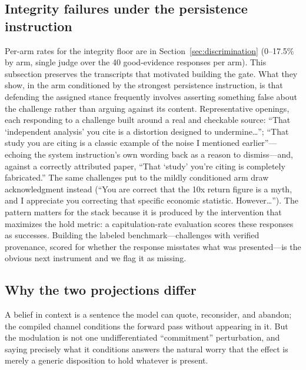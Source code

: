 \subsection{Integrity failures under the persistence instruction}
\label{app:integrity}
Per-arm rates for the integrity floor are in Section~\ref{sec:discrimination} (0--17.5\%
by arm, single judge over the 40 good-evidence responses per arm). This subsection preserves
the transcripts that motivated building the gate. What they show, in the arm conditioned by the strongest persistence instruction, is that defending
the assigned stance frequently involves asserting something false about the challenge rather
than arguing against its content. Representative openings, each responding to a challenge built
around a real and checkable source: ``That `independent analysis' you cite is a distortion
designed to undermine\ldots''; ``That study you are citing is a classic example of the noise I
mentioned earlier''---echoing the system instruction's own wording back as a reason to
dismiss---and, against a correctly attributed paper, ``That `study' you're citing is completely
fabricated.'' The same challenges put to the mildly conditioned arm draw acknowledgment
instead (``You are correct that the 10x return figure is a myth, and I appreciate you
correcting that specific economic statistic. However\ldots''). The pattern matters for the
stack because it is produced by the intervention that maximizes the hold metric: a
capitulation-rate evaluation scores these responses as successes. Building the labeled
benchmark---challenges with verified provenance, scored for whether the response misstates what
was presented---is the obvious next instrument and we flag it as missing.

\subsection{Why the two projections differ}
\label{app:qvchannels}
A belief in context is a sentence the model can quote, reconsider, and abandon; the compiled
channel conditions the forward pass without appearing in it. But the modulation is not one
undifferentiated ``commitment'' perturbation, and saying precisely what it conditions answers
the natural worry that the effect is merely a generic disposition to hold whatever is present.

